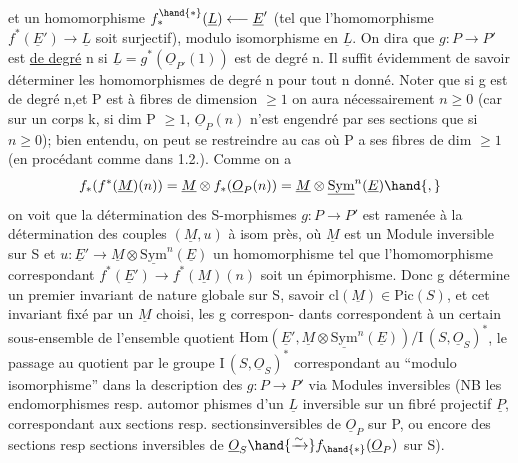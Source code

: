 
et  un homomorphisme  $f^{\hand{*}}_{*}(\underline{L}) \longleftarrow \underline{E}'$  (tel que l'homomorphisme 
$f^{*}(\underline{E}') \to \underline{L}$  soit surjectif), modulo  isomorphisme en $\underline{L}$.  On dira que
$g\colon P \to P'$  est \uline{de degré} n si $\underline{L} = g^{*}(\underline{O}_{P'}(1))$  est de degré n. Il suffit
évidemment de savoir déterminer les homomorphismes de degré n pour tout n
donné.  Noter que si g est de degré n,et P est à fibres de dimension $\geq 1$ on aura nécessairement $n \geq 0$
(car  sur un corps k,  si dim P $\geq 1$, $\underline{O}_P(n)$ n'est engendré par ses
sections que si $n \geq 0$); bien entendu, on peut  se restreindre au cas
où P a ses fibres de dim $\geq 1$ (en procédant comme dans 1.2.).  Comme on a
\[ f_{*}(f^{*}(\underline{M})(n)) = \underline{M} \otimes f_{*}(\underline{O}_P(n)) = \underline{M} \otimes \underline{\mathrm{Sym}}^{n}(\underline{E}) \hand{,} \]
on voit que la détermination des S-morphismes  $g\colon P \to P'$  est ramenée
à la détermination des couples $(\underline{M},u)$ à isom près, où $\underline{M}$  est un Module
inversible sur S et  $u\colon \underline{E}' \to \underline{M}\otimes\underline{\mathrm{Sym}}^{n}(\underline{E})$  un homomorphisme  tel que
l'homomorphisme correspondant  $f^{*}(\underline{E}') \to f^{*}(\underline{M})(n)$  soit un épimorphisme.
Donc  g détermine un premier invariant de nature globale sur S, savoir
$\mathrm{cl}(\underline{M}) \in \mathrm{Pic}(S)$, et cet invariant fixé par un $\underline{M}$ choisi,  les g correspon-%
dants correspondent à un certain sous-ensemble de l'ensemble quotient
$\mathrm{Hom}(\underline{E}',\underline{M}\otimes\underline{\mathrm{Sym}}^{n}(\underline{E}))/\mathrm{I}\,(S,\underline{O}_S)^{*}$,  le passage au quotient par le groupe
$\mathrm{I}\,(S,\underline{O}_S)^{*}$ correspondant  au  ``modulo isomorphisme'' dans la description
des $g\colon P \to P'$ via Modules inversibles  (NB  les endomorphismes resp. automor
phismes d'un $\underline{L}$ inversible sur un fibré projectif $\underline{P}$, correspondant aux
sections resp. sections\hand{$|$}inversibles de $\underline{O}_P$ sur P,  ou encore des sections
resp sections inversibles de $\underline{O}_S \hand{\xrightarrow{\sim}} f_{\hand{*}}(\underline{O}_P)$ sur S).

